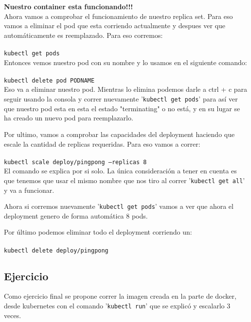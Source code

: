 \documentclass[11pt]{article} %
\begin{document}
\textbf{Nuestro container esta funcionando!!!}\\

Ahora vamos a comprobar el funcionamiento de nuestro replica set. Para eso vamos a eliminar el pod que esta corriendo actualmente y despues ver que automáticamente es reemplazado. Para eso corremos:\\ \\ 
    \texttt{kubectl get pods} \\

Entonces vemos nuestro pod con su nombre y lo usamos en el siguiente comando:\\ \\
    \texttt{kubectl delete pod PODNAME} \\

Eso va a eliminar nuestro pod. Mientras lo elimina podemos darle a ctrl + c para seguir usando la consola y correr nuevamente '\texttt{kubectl get pods}' para así ver que nuestro pod esta en esta el estado "terminating" o no está, y en su lugar se ha creado un nuevo pod para reemplazarlo.

Por ultimo, vamos a comprobar las capacidades del deployment haciendo que escale la cantidad de replicas requeridas. Para eso vamos a correr:\\ \\
    \texttt{kubectl scale deploy/pingpong --replicas 8} \\

El comando se explica por si solo. La única consideración a tener en cuenta es que tenemos que usar el mismo nombre que nos tiro al correr '\texttt{kubectl get all}' y va a funcionar.

Ahora si corremos nuevamente '\texttt{kubectl get pods}' vamos a ver que ahora el deployment genero de forma automática 8 pods.

Por último podemos eliminar todo el deployment corriendo un:\\ \\
    \texttt{kubectl delete deploy/pingpong} \\

\subsection{Ejercicio}

Como ejercicio final se propone correr la imagen creada en la parte de docker, desde kubernetes con el comando '\texttt{kubectl run}' que se explicó y escalarlo 3 veces.
\end{document}
